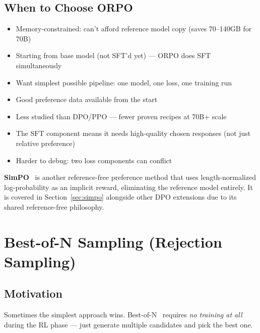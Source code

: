 \subsection{When to Choose ORPO}
\label{when-to-choose-orpo}

\begin{itemize}
  \item Memory-constrained: can’t afford reference model copy (saves 70--140GB for 70B)
  \item Starting from base model (not SFT’d yet) --- ORPO does SFT simultaneously
  \item Want simplest possible pipeline: one model, one loss, one training run
  \item Good preference data available from the start
\end{itemize}

\begin{warningbox}
\begin{itemize}
  \item Less studied than DPO/PPO --- fewer proven recipes at 70B+ scale
  \item The SFT component means it needs high-quality chosen responses (not just relative preference)
  \item Harder to debug: two loss components can conflict
\end{itemize}
\end{warningbox}

\begin{keybox}
\textbf{SimPO}~\cite{meng2024simpo} is another reference-free preference method that uses length-normalized log-probability as an implicit reward, eliminating the reference model entirely. It is covered in Section~\ref{sec:simpo} alongside other DPO extensions due to its shared reference-free philosophy.
\end{keybox}

\section{Best-of-N Sampling (Rejection Sampling)}
\label{best-of-n-sampling-rejection-sampling}

\subsection{Motivation}
\label{motivation-4}

Sometimes the simplest approach wins. Best-of-N~\cite{nakano2021webgpt} requires \emph{no training at all} during the RL phase --- just generate multiple candidates and pick the best one.

